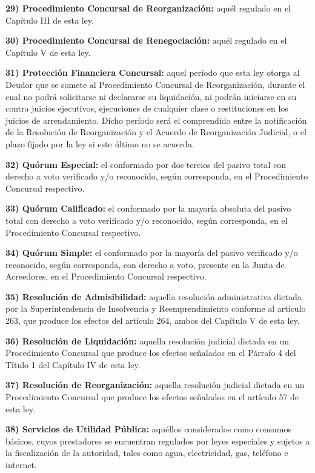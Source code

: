 \documentclass[
]{book}
\begin{document}
\textbf{29) Procedimiento Concursal de Reorganización:} aquél regulado en el Capítulo III de esta ley.

\textbf{30) Procedimiento Concursal de Renegociación:} aquél regulado en el Capítulo V de esta ley.

\textbf{31) Protección Financiera Concursal:} aquel período que esta ley otorga al Deudor que se somete al Procedimiento Concursal de Reorganización, durante el cual no podrá solicitarse ni declararse su liquidación, ni podrán iniciarse en su contra juicios ejecutivos, ejecuciones de cualquier clase o restituciones en los juicios de arrendamiento. Dicho período será el comprendido entre la notificación de la Resolución de Reorganización y el Acuerdo de Reorganización Judicial, o el plazo fijado por la ley si este último no se acuerda.

\textbf{32) Quórum Especial:} el conformado por dos tercios del pasivo total con derecho a voto verificado y/o reconocido, según corresponda, en el Procedimiento Concursal respectivo.

\textbf{33) Quórum Calificado:} el conformado por la mayoría absoluta del pasivo total con derecho a voto verificado y/o reconocido, según corresponda, en el Procedimiento Concursal respectivo.

\textbf{34) Quórum Simple:} el conformado por la mayoría del pasivo verificado y/o reconocido, según corresponda, con derecho a voto, presente en la Junta de Acreedores, en el Procedimiento Concursal respectivo.

\textbf{35) Resolución de Admisibilidad:} aquella resolución administrativa dictada por la Superintendencia de Insolvencia y Reemprendimiento conforme al artículo 263, que produce los efectos del artículo 264, ambos del Capítulo V de esta ley.

\textbf{36) Resolución de Liquidación:} aquella resolución judicial dictada en un Procedimiento Concursal que produce los efectos señalados en el Párrafo 4 del Título 1 del Capítulo IV de esta ley.

\textbf{37) Resolución de Reorganización:} aquella resolución judicial dictada en un Procedimiento Concursal que produce los efectos señalados en el artículo 57 de esta ley.

\textbf{38) Servicios de Utilidad Pública:} aquéllos considerados como consumos básicos, cuyos prestadores se encuentran regulados por leyes especiales y sujetos a la fiscalización de la autoridad, tales como agua, electricidad, gas, teléfono e internet.
\end{document}

